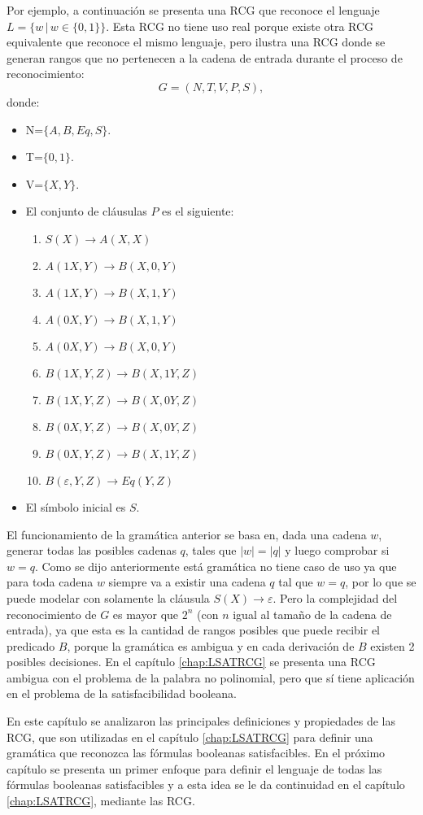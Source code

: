 Por ejemplo, a continuación se presenta una RCG que reconoce el lenguaje $L=\{w\,|\,w\in\{0,1\}\}$. Esta RCG no tiene uso real porque existe otra RCG equivalente que reconoce el
mismo lenguaje, pero ilustra una RCG donde se generan rangos que no pertenecen a la cadena de entrada durante el proceso
de reconocimiento:
\[
    G = (N, T, V, P, S),
\]
donde:

\begin{itemize}
    \item  N=$\{A,B,Eq,S\}$.
    \item T=$\{0,1\}$.
    \item V=$\{X,Y\}$.
    \item El conjunto de cláusulas $P$ es el siguiente:
          \begin{enumerate}
              \item $S(X)\to A(X,X)$
              \item $A(1X,Y)\to B(X,0,Y)$
              \item $A(1X,Y)\to B(X,1,Y)$
              \item $A(0X,Y)\to B(X,1,Y)$
              \item $A(0X,Y)\to B(X,0,Y)$
              \item $B(1X,Y,Z)\to B(X,1Y,Z)$
              \item $B(1X,Y,Z)\to B(X,0Y,Z)$
              \item $B(0X,Y,Z)\to B(X,0Y,Z)$
              \item $B(0X,Y,Z)\to B(X,1Y,Z)$
              \item $B(\varepsilon,Y,Z)\to Eq(Y,Z)$
          \end{enumerate}

    \item El símbolo inicial es $S$.
\end{itemize}

El funcionamiento de la gramática anterior se basa en, dada una cadena $w$, generar todas las posibles
cadenas $q$, tales que $|w|=|q|$ y luego comprobar si $w = q$. Como se dijo anteriormente está gramática
no tiene caso de uso ya que para toda cadena $w$ siempre va a existir una cadena $q$ tal que $w=q$,
por lo que se puede modelar con solamente la cláusula $S(X)\to \varepsilon$. Pero la complejidad del
reconocimiento de $G$ es mayor que $2^n$ (con $n$ igual al tamaño de la cadena de entrada), ya que esta
es la cantidad de rangos posibles que puede recibir el predicado $B$, porque la gramática es ambigua
y en cada derivación de $B$ existen 2 posibles decisiones. En el capítulo \ref{chap:LSATRCG} se presenta una
RCG ambigua con el problema de la palabra no polinomial, pero que sí tiene aplicación en el problema de la
satisfacibilidad booleana.

En este capítulo se analizaron las principales definiciones y propiedades de las RCG, que son utilizadas
en el capítulo \ref{chap:LSATRCG} para definir una gramática que reconozca las fórmulas booleanas satisfacibles.
En el próximo capítulo se presenta un primer enfoque para definir el lenguaje de todas las fórmulas booleanas
satisfacibles y a esta idea se le da continuidad en el capítulo \ref{chap:LSATRCG}, mediante las RCG.
